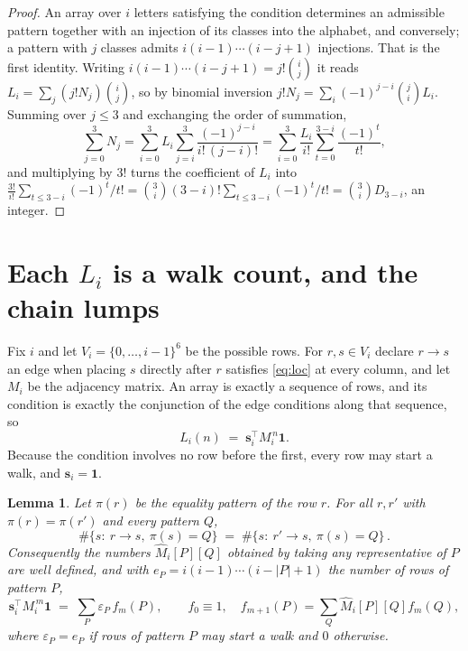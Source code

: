 \documentclass[11pt,a4paper]{article}
\theoremstyle{plain}
\newtheorem{lemma}[theorem]{Lemma}
\theoremstyle{definition}
\begin{document}
\begin{proof}
An array over $i$ letters satisfying the condition determines an admissible pattern together
with an injection of its classes into the alphabet, and conversely; a pattern with $j$
classes admits $i(i-1)\cdots(i-j+1)$ injections. That is the first identity. Writing
$i(i-1)\cdots(i-j+1)=j!\binom{i}{j}$ it reads $L_i=\sum_j (j!N_j)\binom{i}{j}$, so by
binomial inversion $j!N_j=\sum_{i}(-1)^{j-i}\binom{j}{i}L_i$. Summing over
$j\le 3$ and exchanging the order of summation,
\[
\sum_{j=0}^{3}N_j=\sum_{i=0}^{3}L_i\sum_{j=i}^{3}\frac{(-1)^{j-i}}{i!\,(j-i)!}
=\sum_{i=0}^{3}\frac{L_i}{i!}\sum_{t=0}^{3-i}\frac{(-1)^t}{t!} ,
\]
and multiplying by $3!$ turns the coefficient of $L_i$ into
$\frac{3!}{i!}\sum_{t\le 3-i}(-1)^t/t!=\binom{3}{i}(3-i)!\sum_{t\le 3-i}(-1)^t/t!
=\binom{3}{i}D_{3-i}$, an integer.
\end{proof}

\section{Each $L_i$ is a walk count, and the chain lumps}

Fix $i$ and let $V_i=\{0,\dots,i-1\}^{6}$ be the possible rows. For $r,s\in V_i$
declare $r\to s$ an edge when placing $s$ directly after $r$ satisfies \eqref{eq:loc} at
every column, and let $M_i$ be the adjacency matrix. An array is exactly a sequence of
rows, and its condition is exactly the conjunction of the edge conditions along that
sequence, so
\[
L_i(n)\;=\;\mathbf{s}_i^{\!\top}M_i^{\,n}\mathbf{1} .
\]
Because the condition involves no row before the first, every
row may start a walk, and $\mathbf{s}_i=\mathbf{1}$.

\begin{lemma}\label{lem:lump}
Let $\pi(r)$ be the equality pattern of the row $r$. For all $r,r'$ with
$\pi(r)=\pi(r')$ and every pattern $Q$,
\[
\#\{s:\ r\to s,\ \pi(s)=Q\}\;=\;\#\{s:\ r'\to s,\ \pi(s)=Q\}\, .
\]
Consequently the numbers $\widehat M_i[P][Q]$ obtained by taking any representative of $P$
are well defined, and with $e_P=i(i-1)\cdots(i-|P|+1)$ the number of rows of pattern $P$,
\[
\mathbf{s}_i^{\!\top}M_i^{\,m}\mathbf{1}\;=\;\sum_P \varepsilon_P\,f_m(P),
\qquad f_0\equiv1,\quad f_{m+1}(P)=\sum_Q\widehat M_i[P][Q]f_m(Q),
\]
where $\varepsilon_P=e_P$ if rows of pattern $P$ may start a walk and $0$ otherwise.
\end{lemma}
\end{document}
